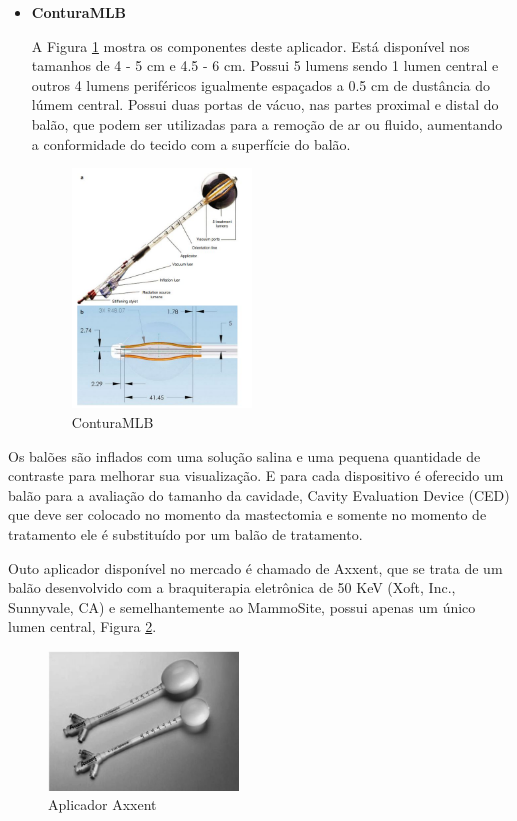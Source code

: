 \documentclass[11pt,a4paper]{article}
\begin{document}
\begin{itemize}
				
				\item \textbf{\textcolor{CarnationPink}{ConturaMLB}}
					
					A Figura \ref{img:conturaMLB} mostra os componentes deste aplicador. Está disponível nos tamanhos de 4 - 5 cm e 4.5 - 6 cm. Possui 5 lumens sendo 1 lumen central e outros 4 lumens periféricos igualmente espaçados a 0.5 cm de dustância do lúmem central. Possui duas portas de vácuo, nas partes proximal e distal do balão, que podem ser utilizadas para a remoção de ar ou fluido, aumentando a conformidade do tecido com a superfície do balão.
					
					\begin{figure}[h]
						\centering
						\includegraphics[width=0.45\textwidth]{Imagens/conturaMLB.JPG}
						\caption{ConturaMLB}
						\label{img:conturaMLB}
					\end{figure}
				\end{itemize}
			
			Os balões são inflados com uma solução salina e uma pequena quantidade de contraste para melhorar sua visualização. E para cada dispositivo é oferecido um balão para a avaliação do tamanho da cavidade, \textcolor{CarnationPink}{Cavity Evaluation Device (CED)} que deve ser colocado no momento da mastectomia e somente no momento de tratamento ele é substituído por um balão de tratamento.

			Outo aplicador disponível no mercado é chamado de \textcolor{CarnationPink}{Axxent}, que se trata de um balão desenvolvido com a braquiterapia eletrônica de 50 KeV (Xoft, Inc., Sunnyvale, CA) e semelhantemente ao MammoSite, possui apenas um único lumen central, Figura \ref{img:axxent}.

			\begin{figure}[h]
				\centering
				\includegraphics[width=0.45\textwidth]{Imagens/axxent.JPG}
				\caption{Aplicador Axxent}
				\label{img:axxent}
			\end{figure}

		








	\pagebreak
	
\end{document}
